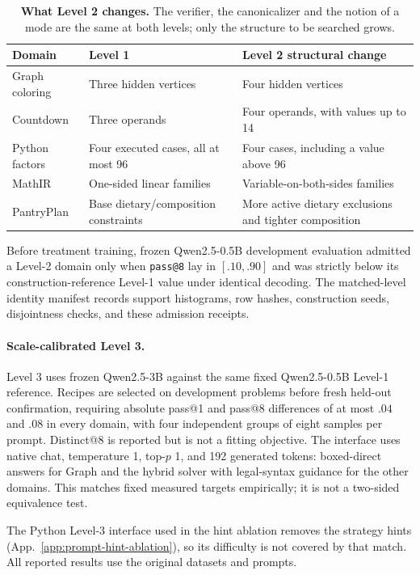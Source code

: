 \documentclass{article}
\newcommand{\1}{\mathbf 1}
\theoremstyle{remark}
\theoremstyle{definition}
\theoremstyle{plain}
\begin{document}
\begin{table}[H]
\centering
\caption{\textbf{What Level 2 changes.} The verifier, the canonicalizer and the
notion of a mode are the same at both levels; only the structure to be searched
grows.}
\label{tab:level2-structure}
\small
\begin{tabularx}{.96\linewidth}{@{}lYY@{}}
\toprule
\textbf{Domain} & \textbf{Level 1} & \textbf{Level 2 structural change} \\
\midrule
Graph coloring & Three hidden vertices & Four hidden vertices \\
Countdown & Three operands & Four operands, with values up to 14 \\
Python factors & Four executed cases, all at most 96 & Four cases, including a value above 96 \\
MathIR & One-sided linear families & Variable-on-both-sides families \\
PantryPlan & Base dietary/composition constraints & More active dietary exclusions and tighter composition \\
\bottomrule
\end{tabularx}
\end{table}

Before treatment training, frozen Qwen2.5-0.5B development evaluation admitted
a Level-2 domain only when \texttt{pass@8} lay in $[.10,.90]$ and was strictly below
its construction-reference Level-1 value under identical decoding. The matched-level
identity manifest records support histograms, row hashes, construction
seeds, disjointness checks, and these admission receipts.


\paragraph{Scale-calibrated Level 3.}
Level 3 uses frozen Qwen2.5-3B against the same fixed Qwen2.5-0.5B Level-1
reference. Recipes are selected on development problems before fresh held-out
confirmation, requiring absolute pass@1 and pass@8 differences of at most
$.04$ and $.08$ in every domain, with four independent groups of eight samples
per prompt. Distinct@8 is reported but is not a fitting objective. The
interface uses native chat, temperature 1, top-$p$ 1, and 192 generated
tokens: boxed-direct answers for Graph and the hybrid solver with
legal-syntax guidance for the other domains. This matches fixed measured
targets empirically; it is not a two-sided equivalence test.

The Python Level-3 interface used in the hint ablation removes the strategy
hints (App.~\ref{app:prompt-hint-ablation}), so its difficulty is not
covered by that match. All reported results use the original datasets and
prompts.
\end{document}
